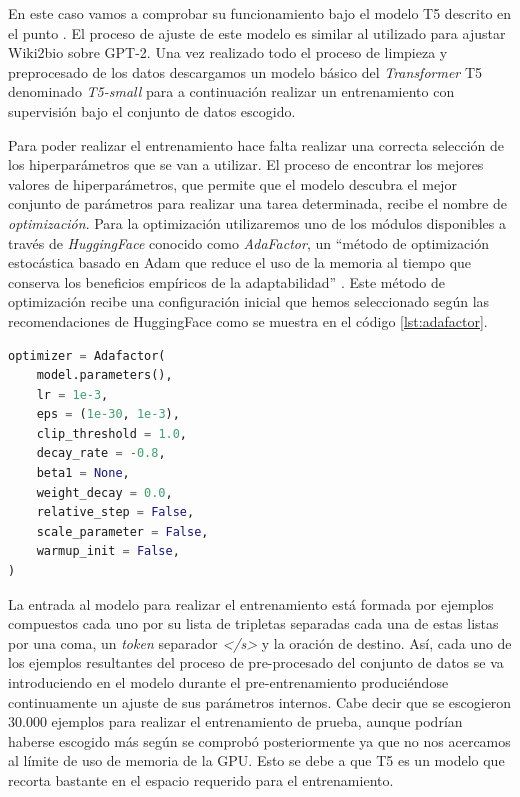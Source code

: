 En este caso vamos a comprobar su funcionamiento bajo el modelo T5 descrito en el punto \label{sec:mtl}. El proceso de ajuste de este modelo es similar al utilizado para ajustar Wiki2bio sobre GPT-2. Una vez realizado todo el proceso de limpieza y preprocesado de los datos descargamos un modelo básico del \textit{Transformer} T5 denominado \textit{T5-small} para a continuación realizar un entrenamiento con supervisión bajo el conjunto de datos escogido. 

Para poder realizar el entrenamiento hace falta realizar una correcta selección de los hiperparámetros que se van a utilizar. El proceso de encontrar los mejores valores de hiperparámetros, que permite que el modelo descubra el mejor conjunto de parámetros para realizar una tarea determinada, recibe el nombre de \textit{optimización}. Para la optimización utilizaremos uno de los módulos disponibles a través de \textit{HuggingFace} conocido como \textit{AdaFactor}, un ``método de optimización estocástica basado en Adam que reduce el uso de la memoria al tiempo que conserva los beneficios empíricos de la adaptabilidad'' \citep{shazeer2018adafactor}.  Este método de optimización recibe una configuración inicial que hemos seleccionado según las recomendaciones de {HuggingFace} como se muestra en el código \ref{lst:adafactor}.

\begin{lstlisting}[language=Python, caption=on, caption=Configuración inicial del optimizador, label={lst:adafactor}]
optimizer = Adafactor(
    model.parameters(),
    lr = 1e-3,
    eps = (1e-30, 1e-3),
    clip_threshold = 1.0,
    decay_rate = -0.8,
    beta1 = None,
    weight_decay = 0.0,
    relative_step = False,
    scale_parameter = False,
    warmup_init = False,
)
\end{lstlisting} 

La entrada al modelo para realizar el entrenamiento está formada por ejemplos compuestos cada uno por su lista de tripletas separadas cada una de estas listas por una coma, un \textit{token} separador \textit{</s>} y la oración de destino. Así, cada uno de los ejemplos resultantes del proceso de pre-procesado del conjunto de datos se va introduciendo en el modelo durante el pre-entrenamiento produciéndose continuamente un ajuste de sus parámetros internos. Cabe decir que se escogieron 30.000 ejemplos para realizar el entrenamiento de prueba, aunque podrían haberse escogido más según se comprobó posteriormente ya que no nos acercamos al límite de uso de memoria de la GPU. Esto se debe a que T5 es un modelo que recorta bastante en el espacio requerido para el entrenamiento.

